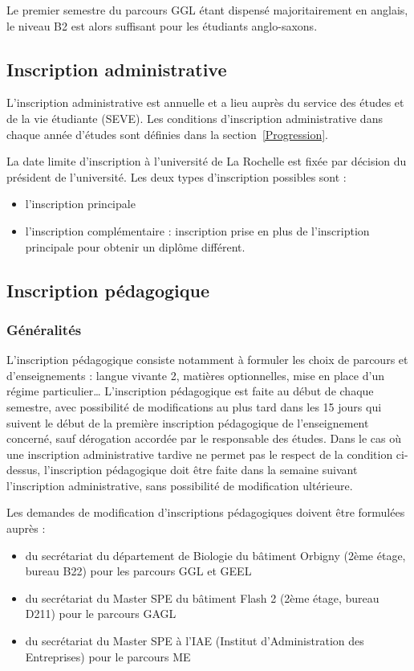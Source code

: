 \documentclass[a4paper,11pt]{article}
\begin{document}
Le premier semestre du parcours GGL étant dispensé majoritairement en anglais, le niveau B2 est alors suffisant pour les étudiants anglo-saxons.

\subsection{Inscription administrative}\label{InsciprtionAdministrative}

L'inscription administrative est annuelle et a lieu auprès du service des études et de la vie étudiante (SEVE). Les conditions d'inscription administrative dans chaque année d'études sont définies dans la section~\ref{Progression}.

La date limite d'inscription à l'université de La Rochelle est fixée par décision du président de l'université.
Les deux types d'inscription possibles sont :
\begin{itemize}
\item l'inscription principale
\item l'inscription complémentaire : inscription prise en plus de l'inscription principale pour obtenir un diplôme différent.
\end{itemize}


\subsection{Inscription pédagogique}\label{InscriptionPeda}

\subsubsection{Généralités}

L'inscription pédagogique consiste notamment à formuler les choix de parcours et d'enseignements : langue vivante 2, matières optionnelles, mise en place d'un régime particulier\ldots{} 
L'inscription pédagogique est faite au début de chaque semestre, avec possibilité de modifications au plus tard dans les 15 jours qui suivent le début de la première inscription pédagogique de l'enseignement concerné, sauf dérogation accordée par le responsable des études.
Dans le cas où une inscription administrative tardive ne permet pas le respect de la condition ci-dessus, l'inscription pédagogique doit être faite dans la semaine suivant l'inscription administrative, sans possibilité de modification ultérieure.

Les demandes de modification d'inscriptions pédagogiques doivent être formulées auprès :
\begin{itemize}
\item du secrétariat du département de Biologie du bâtiment Orbigny (2ème étage, bureau B22) pour les parcours GGL et GEEL
\item du secrétariat du Master SPE du bâtiment Flash 2 (2ème étage, bureau D211) pour le parcours GAGL
\item du secrétariat du Master SPE à l'IAE (Institut d'Administration des Entreprises) pour le parcours ME
\end{itemize}
\end{document}
